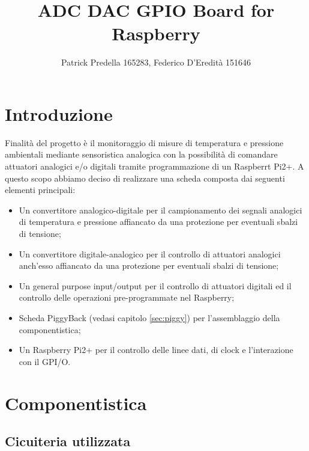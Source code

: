 \documentclass[10pt]{article}
\title{ADC DAC GPIO Board for Raspberry}
\author{Patrick Predella 165283, Federico D'Eredità 151646 }
\date{}
\begin{document}
\maketitle
\tableofcontents

\section{Introduzione}
Finalità del progetto è il monitoraggio di misure di temperatura e pressione ambientali mediante sensoristica analogica con la possibilità di comandare attuatori analogici e/o digitali tramite programmazione di un Raspberrt Pi2+.
A questo scopo abbiamo deciso di realizzare una scheda composta dai seguenti elementi principali:
\begin{itemize}
\item Un convertitore analogico-digitale per il campionamento dei segnali analogici di temperatura e pressione affiancato da una protezione per eventuali sbalzi di tensione;
\item Un convertitore digitale-analogico per il controllo di attuatori analogici anch'esso affiancato da una protezione per eventuali sbalzi di tensione;
\item Un general purpose input/output per il controllo di attuatori digitali ed il controllo delle operazioni pre-programmate nel Raspberry;
\item Scheda PiggyBack (vedasi capitolo \ref{sec:piggy}) per l'assemblaggio della componentistica;
\item Un Raspberry Pi2+ per il controllo delle linee dati, di clock e l'interazione con il GPI/O.
\end{itemize}


\section{Componentistica}
	\subsection{Cicuiteria utilizzata}
\end{document}

